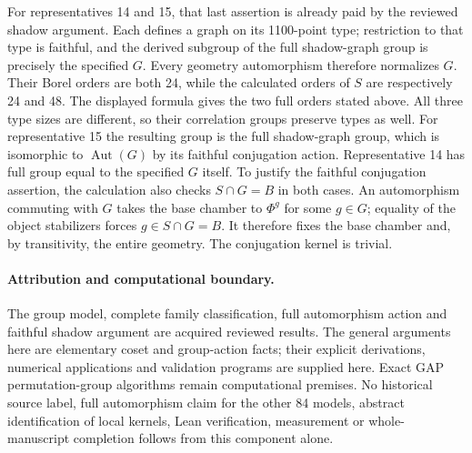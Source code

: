 \documentclass[11pt]{article}
\newcommand{\Aut}{\operatorname{Aut}}\newcommand{\HS}{\mathrm{HS}}
\begin{document}
For representatives 14 and 15, that last assertion is already paid by
the reviewed shadow argument. Each defines a graph on its 1100-point
type; restriction to that type is faithful, and the derived subgroup
of the full shadow-graph group is precisely the specified $G$.
Every geometry automorphism therefore normalizes $G$.
Their Borel orders are both 24, while the calculated orders of $S$
are respectively 24 and 48. The displayed formula gives the two full
orders stated above. All three type sizes are different, so their
correlation groups preserve types as well. For representative 15 the
resulting group is the full shadow-graph group, which is isomorphic
to $\Aut(G)$ by its faithful conjugation action. Representative 14
has full group equal to the specified $G$ itself. To justify the faithful
conjugation assertion, the calculation also checks $S\cap G=B$ in both
cases. An automorphism commuting with $G$ takes the base chamber to
$\Phi^g$ for some $g\in G$; equality of the object stabilizers forces
$g\in S\cap G=B$. It therefore fixes the base chamber and, by
transitivity, the entire geometry. The conjugation kernel is trivial.

\paragraph{Attribution and computational boundary.}
The group model, complete family classification, full automorphism
action and faithful shadow argument are acquired reviewed results.
The general arguments here are elementary coset and group-action
facts; their explicit derivations, numerical applications and validation
programs are supplied here. Exact GAP permutation-group algorithms
remain computational premises. No historical source label, full
automorphism claim for the other 84 models, abstract identification of
local kernels, Lean verification, measurement or whole-manuscript
completion follows from this component alone.
\end{document}
